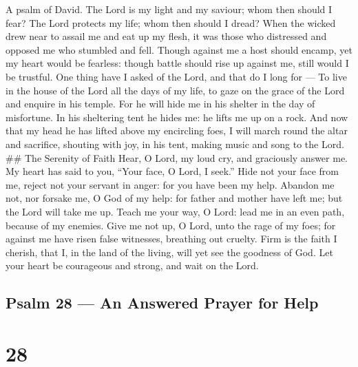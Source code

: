 A psalm of David.  The Lord is my light and my saviour; whom
then should I fear? The Lord protects my life; whom then should I dread?
 When the wicked drew near to assail me and eat up my flesh,
it was those who distressed and opposed me who stumbled and fell.
 Though against me a host should encamp, yet my heart would
be fearless: though battle should rise up against me, still would I be
trustful.  One thing have I asked of the Lord, and that do I
long for --- To live in the house of the Lord all the days of my life,
to gaze on the grace of the Lord and enquire in his temple. 
For he will hide me in his shelter in the day of misfortune. In his
sheltering tent he hides me: he lifts me up on a rock.  And
now that my head he has lifted above my encircling foes, I will march
round the altar and sacrifice, shouting with joy, in his tent, making
music and song to the Lord. \#\# The Serenity of Faith 
Hear, O Lord, my loud cry, and graciously answer me.  My
heart has said to you, ``Your face, O Lord, I seek.''  Hide
not your face from me, reject not your servant in anger: for you have
been my help. Abandon me not, nor forsake me, O God of my help:
 for father and mother have left me; but the Lord will take
me up.  Teach me your way, O Lord: lead me in an even path,
because of my enemies.  Give me not up, O Lord, unto the
rage of my foes; for against me have risen false witnesses, breathing
out cruelty.  Firm is the faith I cherish, that I, in the
land of the living, will yet see the goodness of God.  Let
your heart be courageous and strong, and wait on the Lord.

\hypertarget{psalm-28-an-answered-prayer-for-help}{%
\subsection{Psalm 28 --- An Answered Prayer for
Help}\label{psalm-28-an-answered-prayer-for-help}}

\hypertarget{section-27}{%
\section{28}\label{section-27}}

